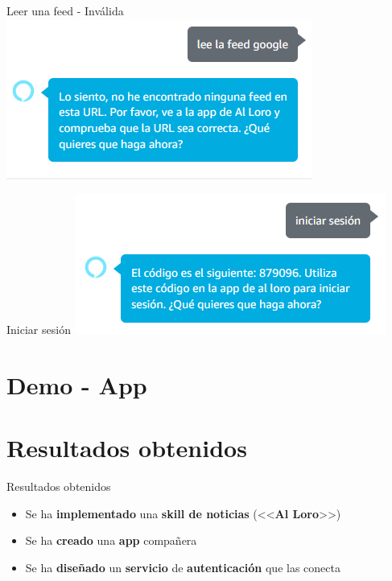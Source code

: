 \documentclass{beamer}
\begin{document}
  \begin{frame}{Leer una feed - Inválida}
    \includegraphics[width=\textwidth]{feed-invalida.png}
  \end{frame}

  \begin{frame}{Iniciar sesión}
    \includegraphics[width=\textwidth]{iniciar-sesion.png}
  \end{frame}

  \section*{Demo - App}

  \section{Resultados obtenidos}
 
  \begin{frame}{Resultados obtenidos}
    \begin{itemize}
      \setlength\itemsep{1.5em}
      \item Se ha \textbf{implementado} una \textbf{skill de noticias} (<<\textbf{Al Loro}>>)
      \item Se ha \textbf{creado} una \textbf{app} compañera
      \item Se ha \textbf{diseñado} un \textbf{servicio} de \textbf{autenticación} que las conecta
    \end{itemize}
  \end{frame}
\end{document}

